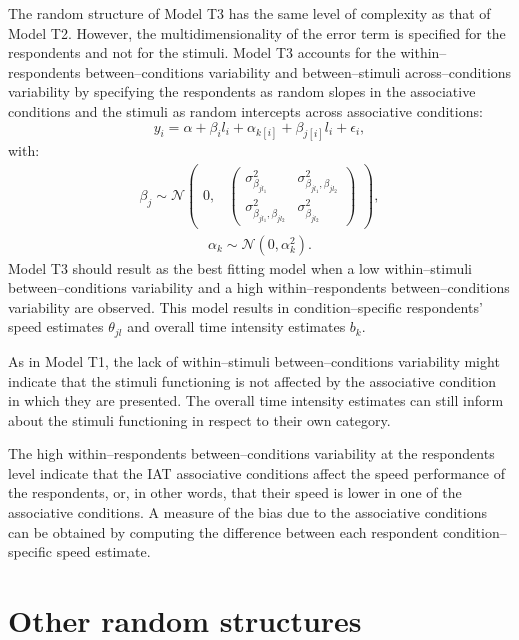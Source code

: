 \documentclass{book}
\begin{document}
The random structure of Model T3 has the same level of complexity as that of Model T2. However, the multidimensionality of the error term is specified for the respondents and not for the stimuli. 
Model T3 accounts for the within--respondents between--conditions variability and between--stimuli across--conditions variability by specifying the respondents as random slopes in the associative conditions and the stimuli as random intercepts across associative conditions: 
%
\begin{equation}\label{logtime3}
	y_{i} = \alpha + \beta_il_i + \alpha_{k[i]} +  \beta_{j[i]}l_{i} + \epsilon_{i},
\end{equation}
with:
\begin{align}
	\beta_{j} \sim  \mathcal{N}
	\begin{pmatrix}
		0,&
		\begin{pmatrix}
			\sigma_{\beta_{jl_1}}^2 & \sigma_{\beta_ {jl_1}, \beta_{jl_2}}^2 \\
			\sigma_{{\beta_{jl_1}}, \beta_{jl_2}}^2& \sigma_{\beta_{jl_2}}^2
		\end{pmatrix}
	\end{pmatrix},
\end{align}
\begin{align}
	\alpha_k \sim \mathcal{N} (0, \alpha_k^2).
\end{align}
%
Model T3 should result as the best fitting model when a low within--stimuli between--conditions variability and a high within--respondents between--conditions variability are observed. This model results in condition--specific respondents' speed estimates $\theta_{jl}$ and overall time intensity estimates $b_k$. 

As in Model T1, the lack of within--stimuli between--conditions variability might indicate that the stimuli functioning is not affected by the associative condition in which they are presented. The overall time intensity estimates can still inform about the stimuli functioning in respect to their own category. 

The high within--respondents between--conditions variability at the respondents level indicate that the IAT associative conditions affect the speed performance of the respondents, or, in other words, that their speed is lower in one of the associative conditions.
A measure of the bias due to the associative conditions can be obtained by computing the difference between each respondent condition--specific speed estimate. 


\section{Other random structures}
\end{document}
